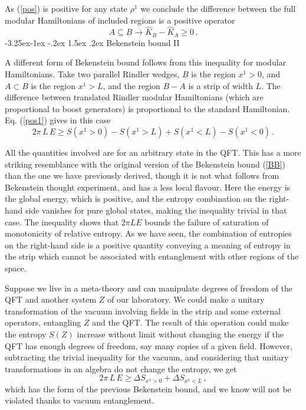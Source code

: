 \documentclass[11pt,a4paper]{article}
\makeatletter
\renewcommand\subsection{\@startsection{subsection}{2}{\z@}%
                                   {-3.25ex\@plus -1ex \@minus -.2ex}%
                                     {1.5ex \@plus .2ex}%
                                     {\normalfont\bfseries}}
\numberwithin{equation}{section}
\newcommand{\be}{\begin{equation}}
\newcommand{\ee}{\end{equation}}
\makeatother
\begin{document}
As (\ref{pos}) is positive for any state $\rho^1$ we conclude the difference between the full modular Hamiltonians of included regions is a positive operator
\be
A\subseteq B\rightarrow \hat{K}_B-\hat{K}_A\ge 0\,.\label{mono}
\ee
\subsection{Bekenstein bound II }

A different form of Bekenstein bound follows from this inequality for modular Hamiltonians. Take two parallel Rindler wedges, $B$ is the region $x^1>0$, and $A\subset B$ is the region $x^1>L$, and the region $B-A$ is a strip of width $L$. The difference between translated Rindler modular Hamiltonians (which are proportional to boost generators) is proportional to the standard Hamiltonian. Eq. (\ref{pos1}) gives in this case
\be
2 \pi \,L \,E\ge S(x^1>0)-S(x^1>L)+S(x^1<L)-S(x^1 <0)\,.    
\ee

All the quantities involved are for an arbitrary state in the QFT. This has a more striking resemblance with the original version of the Bekenstein bound (\ref{BB}) than the one we have previously derived, though it is not what follows from Bekenstein thought experiment, and has a less local flavour. Here the energy is the global energy, which is positive, and the entropy combination on the right-hand side vanishes for pure global states, making the inequality trivial in that case. The inequality shows that $2\pi L E $ bounds the failure of saturation of monotonicity of relative entropy. As we have seen, the combination of entropies on the right-hand side is a positive quantity conveying a meaning of entropy in the strip which cannot be associated with entanglement with other regions of the space. 

Suppose we live in a meta-theory and can manipulate degrees of freedom of the QFT and another system $Z$ of our laboratory. We could make a unitary transformation of the vacuum involving fields in the strip and some external operators, entangling $Z$ and the QFT. The result of this operation could make the entropy $S(Z)$ increase without limit without changing the energy if the QFT has enough degrees of freedom, say many copies of a given field. However, subtracting the trivial inequality for the vacuum, and considering that unitary transformations in an algebra do not change the entropy, we get 
\be
2\pi\,L\,  E\ge \Delta S_{x^1>0}+\Delta S_{x^1<L}\,,    
\ee
which has the form of the previous Bekenstein bound, and we know will not be violated thanks to vacuum entanglement.  
\end{document}
